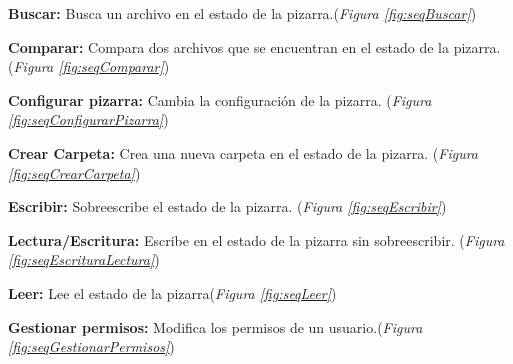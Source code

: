 \textbf{Buscar:} Busca un archivo en el estado de la pizarra.(\emph{Figura \ref{fig:seqBuscar}}) 

\begin{sidewaysfigure}
\centering
\seqBuscar
\caption{Diagrama de secuencia de buscar}
\label{fig:seqBuscar}
\end{sidewaysfigure}

\textbf{Comparar:} Compara dos archivos que se encuentran en el estado de la pizarra.(\emph{Figura \ref{fig:seqComparar}}) 

\begin{sidewaysfigure}
\centering
\seqComparar
\caption{Diagrama de secuencia de comparar}
\label{fig:seqComparar}
\end{sidewaysfigure}


\textbf{Configurar pizarra:} Cambia la configuración de la pizarra. (\emph{Figura \ref{fig:seqConfigurarPizarra}}) 

\begin{sidewaysfigure}
\centering
\seqConfigurarPizarra
\caption{Diagrama de secuencia de configurar pizarra}
\label{fig:seqConfigurarPizarra}
\end{sidewaysfigure}

\textbf{Crear Carpeta:} Crea una nueva carpeta en el estado de la pizarra. (\emph{Figura \ref{fig:seqCrearCarpeta}}) 

\begin{sidewaysfigure}
\centering
\seqCrearCarpeta
\caption{Diagrama de secuencia de crear carpeta}
\label{fig:seqCrearCarpeta}
\end{sidewaysfigure}


\textbf{Escribir:} Sobreescribe el estado de la pizarra. (\emph{Figura \ref{fig:seqEscribir}}) 

\begin{sidewaysfigure}
\centering
\seqEscribir
\caption{Diagrama de secuencia de escribir}
\label{fig:seqEscribir}
\end{sidewaysfigure}

\textbf{Lectura/Escritura:} Escribe en el estado de la pizarra sin sobreescribir. (\emph{Figura \ref{fig:seqEscrituraLectura}}) 

\begin{sidewaysfigure}
\centering
\seqEscrituraLectura
\caption{Diagrama de secuencia de lectura/escritura}
\label{fig:seqEscrituraLectura}
\end{sidewaysfigure}

\textbf{Leer:} Lee el estado de la pizarra(\emph{Figura \ref{fig:seqLeer}}) 

\begin{sidewaysfigure}
\centering
\seqLeer
\caption{Diagrama de secuencia de leer}
\label{fig:seqLeer}
\end{sidewaysfigure}

\textbf{Gestionar permisos:} Modifica los permisos de un usuario.(\emph{Figura \ref{fig:seqGestionarPermisos}}) 

\begin{sidewaysfigure}
\centering
\seqGestionarPermisos
\caption{Diagrama de secuencia de gestionar permisos}
\label{fig:seqGestionarPermisos}
\end{sidewaysfigure}